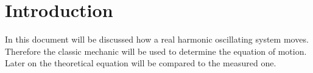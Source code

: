 \section{Introduction}
In this document will be discussed how a real harmonic oscillating system moves. Therefore the classic mechanic will be used to determine the equation of motion. Later on the theoretical equation will be compared to the measured one.